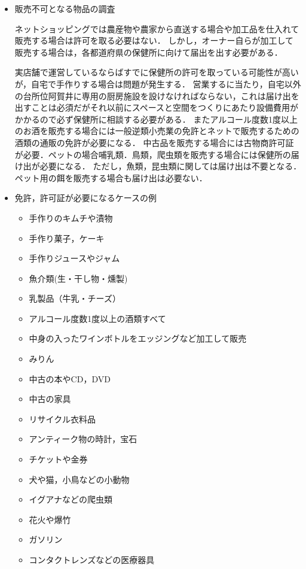 \begin{itemize}
 \item	販売不可となる物品の調査

ネットショッピングでは農産物や農家から直送する場合や加工品を仕入れて販売する場合は許可を取る必要はない．
しかし，オーナー自らが加工して販売する場合は，各都道府県の保健所に向けて届出を出す必要がある．

実店舗で運営しているならばすでに保健所の許可を取っている可能性が高いが，自宅で手作りする場合は問題が発生する．
営業するに当たり，自宅以外の台所位阿賀井に専用の厨房施設を設けなければならない，これは届け出を出すことは必須だがそれ以前にスペースと空間をつくりにあたり設備費用がかかるので必ず保健所に相談する必要がある．
またアルコール度数1度以上のお酒を販売する場合には一般逆類小売業の免許とネットで販売するための酒類の通販の免許が必要になる．
中古品を販売する場合には古物商許可証が必要．ペットの場合哺乳類．鳥類，爬虫類を販売する場合には保健所の届け出が必要になる．
ただし，魚類，昆虫類に関しては届け出は不要となる．ペット用の餌を販売する場合も届け出は必要ない．



 \item	免許，許可証が必要になるケースの例
\begin{itemize}
\setlength{\parskip}{3mm}
 \item	手作りのキムチや漬物
 \item	手作り菓子，ケーキ
 \item	手作りジュースやジャム
 \item	魚介類(生・干し物・燻製)
 \item	乳製品（牛乳・チーズ）
 \item	アルコール度数1度以上の酒類すべて
 \item	中身の入ったワインボトルをエッジングなど加工して販売
 \item	みりん
 \item	中古の本やCD，DVD
 \item	中古の家具
 \item	リサイクル衣料品
 \item	アンティーク物の時計，宝石
 \item	チケットや金券
 \item	犬や猫，小鳥などの小動物
 \item	イグアナなどの爬虫類
 \item	花火や爆竹
 \item	ガソリン
 \item	コンタクトレンズなどの医療器具
\end{itemize}




\end{itemize}
